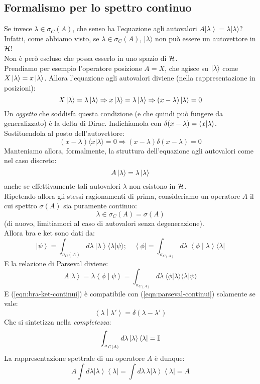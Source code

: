 \documentclass[../../FisicaTeorica.tex]{subfiles}
\begin{document}
\subsection{Formalismo per lo spettro continuo}
Se invece $\lambda \in \sigma_C\left(A\right)$, che senso ha l'equazione agli autovalori $A\left|\lambda\right\rangle=\lambda |\lambda  \rangle$?\\
Infatti, come abbiamo visto, se $\lambda \in \sigma_C(A)$, $|\lambda\rangle$  non può essere un autovettore in $\mathcal{H}$!\\
Non è però escluso che possa esserlo in uno spazio  di $\mathcal{H}$.\\
Prendiamo per esempio l'operatore posizione $A=X$, che agisce su $\ket{\lambda}$ come $X\ket{\lambda} = x \ket{\lambda}$. Allora l'equazione agli autovalori diviene (nella rappresentazione in posizioni):
\[
X\ket{\lambda} = \lambda\ket{\lambda} \Rightarrow x\ket{\lambda} = \lambda\ket{\lambda} \Rightarrow (x-\lambda)\ket{\lambda} = 0
\]
Un \textit{oggetto} che soddisfa questa condizione (e che quindi può fungere da  generalizzato) è la delta di Dirac. Indichiamola con $\delta(x-\lambda) = \braket{x|\lambda}$. Sostituendola al posto dell'autovettore:
\[
(x-\lambda )\langle x | \lambda \rangle = 0 \Rightarrow (x-\lambda)\delta(x-\lambda) = 0
\]
Manteniamo allora, formalmente, la struttura dell'equazione agli autovalori come nel caso discreto:
\[
A\ket{\lambda} = \lambda \ket{\lambda}
\]
anche se effettivamente tali autovalori $\lambda$ non esistono in $\mathcal{H}$.\\
Ripetendo allora gli stessi ragionamenti di prima, consideriamo un operatore $A$ il cui spettro $\sigma(A)$ sia puramente continuo:
\[
\lambda \in \sigma_C\left(A\right)=\sigma (A)
\]
(di nuovo, limitiamoci al caso di autovalori senza degenerazione).\\
Allora bra e ket sono dati da:
\begin{equation}
\left|\psi\right\rangle= \int_{\sigma_C(A)}{d\lambda\ \left|\lambda\right\rangle\langle\lambda|\psi\rangle };\quad
\left\langle\phi\right|= \int_{\sigma_{C\left(A\right)}}{d\lambda\ \left\langle\phi\middle|\lambda\right\rangle\langle\lambda|}
\label{eqn:bra-ket-continui}
\end{equation}
E la relazione di Parseval diviene:
\begin{equation}
    A\left|\lambda\right\rangle=\lambda 
\left\langle\phi\middle|\psi\right\rangle= \int_{\sigma_{C\left(A\right)}}{d\lambda\ \langle\phi|\lambda\rangle \langle\lambda|\psi\rangle }
    \label{eqn:parseval-continui}
\end{equation}
E (\ref{eqn:bra-ket-continui}) è compatibile con (\ref{eqn:parseval-continui}) solamente se vale:
\[
\left\langle\lambda\middle|\lambda'\right\rangle= \delta \left(\lambda-\lambda'\right)
\]
Che si sintetizza nella \textit{completezza}:
\[
\int_{\sigma_{C\left(A\right)}}{d\lambda\left|\lambda\right\rangle\left\langle\lambda\right|}=\mathbb{I}
\]
La rappresentazione spettrale di un operatore $A$ è dunque:
\[
A\int d\lambda  \left|\lambda\right\rangle\left\langle\lambda\right|=\int d\lambda\,\lambda \left|\lambda\right\rangle\left\langle\lambda\right|=A 
\]
\end{document}
